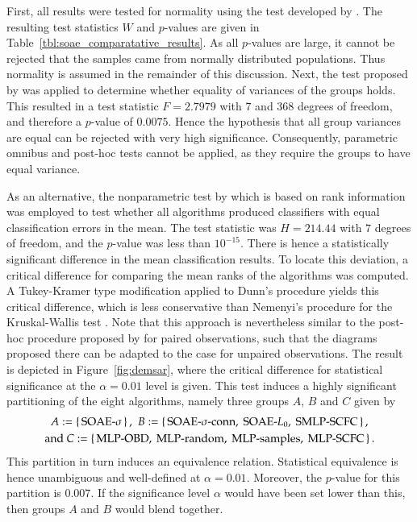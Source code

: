 \documentclass[twoside,11pt]{article}
\newcommand{\0}{\mathcal{O}}
\begin{document}
First, all results were tested for normality using the test developed by \citet{Shapiro1965}.
The resulting test statistics $W$ and $p$-values are given in Table~\ref{tbl:soae_comparatative_results}.
As all $p$-values are large, it cannot be rejected that the samples came from normally distributed populations.
Thus normality is assumed in the remainder of this discussion.
Next, the test proposed by \citet{Levene1960} was applied to determine whether equality of variances of the groups holds.
This resulted in a test statistic $F = 2.7979$ with $7$ and $368$ degrees of freedom, and therefore a $p$-value of $0.0075$.
Hence the hypothesis that all group variances are equal can be rejected with very high significance.
Consequently, parametric omnibus and post-hoc tests cannot be applied, as they require the groups to have equal variance.

As an alternative, the nonparametric test by \citet{Kruskal1952} which is based on rank information was employed to test whether all algorithms produced classifiers with equal classification errors in the mean.
The test statistic was $H = 214.44$ with $7$ degrees of freedom, and the $p$-value was less than $10^{-15}$.
There is hence a statistically significant difference in the mean classification results.
To locate this deviation, a critical difference for comparing the mean ranks of the algorithms was computed.
A Tukey-Kramer type modification applied to Dunn's procedure yields this critical difference, which is less conservative than Nemenyi's procedure for the Kruskal-Wallis test \citep{Hochberg1987}.
Note that this approach is nevertheless similar to the post-hoc procedure proposed by \citet{Demsar2006} for paired observations, such that the diagrams proposed there can be adapted to the case for unpaired observations.
The result is depicted in Figure~\ref{fig:demsar}, where the critical difference for statistical significance at the $\alpha = 0.01$ level is given.
This test induces a highly significant partitioning of the eight algorithms, namely three groups $A$, $B$ and $C$ given by
\begin{gather*}
  A := \set{\text{SOAE-$\sigma$}}\text{, }\;
  B := \set{\text{SOAE-$\sigma$-conn},\ \text{SOAE-$L_0$},\ \text{SMLP-SCFC}}\text{,}\\
  \text{and }C := \set{\text{MLP-OBD},\ \text{MLP-random},\ \text{MLP-samples},\ \text{MLP-SCFC}}\text{.}
\end{gather*}
This partition in turn induces an equivalence relation.
Statistical equivalence is hence unambiguous and well-defined at $\alpha = 0.01$.
Moreover, the $p$-value for this partition is $0.007$.
If the significance level $\alpha$ would have been set lower than this, then groups $A$ and $B$ would blend together.
\end{document}
